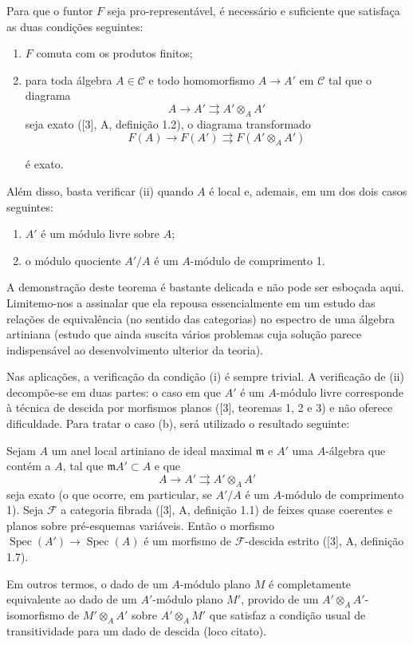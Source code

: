  Para que o funtor $F$ seja pro-representável, é necessário
e suficiente que satisfaça as duas condições seguintes:
\begin{enumerate}
\item[(i)] $F$ comuta com os produtos finitos;
\item[(ii)] para toda álgebra $A\in\mathcal C$ e todo homomorfismo
$A\longrightarrow A'$ em $\mathcal C$ tal que o diagrama
\[
  A\longrightarrow A'\rightrightarrows A'\otimes_A A'
\]
seja exato ([3], A, definição 1.2), o diagrama transformado
\[
  F(A)\longrightarrow F(A')\rightrightarrows F(A'\otimes_A A')
\]

é exato.
\end{enumerate}
Além disso, basta verificar (ii) quando $A$ é local e, ademais, em um dos
dois casos seguintes:
\begin{enumerate}
\item[(a)] $A'$ é um módulo livre sobre $A$;
\item[(b)] o módulo quociente $A'/A$ é um $A$-módulo de comprimento 1.
\end{enumerate}

A demonstração deste teorema é bastante delicada e não pode ser esboçada aqui.
Limitemo-nos a assinalar que ela repousa essencialmente em um estudo das relações
de equivalência (no sentido das categorias) no espectro de uma álgebra
artiniana (estudo que ainda suscita vários problemas cuja solução parece
indispensável ao desenvolvimento ulterior da teoria).

Nas aplicações, a verificação da condição (i) é sempre trivial.
A verificação de (ii) decompõe-se em duas partes: o caso em que $A'$ é um $A$-módulo livre
corresponde à técnica de descida por morfismos planos ([3], teoremas 1, 2 e
3) e não oferece dificuldade. Para tratar o caso (b), será utilizado o resultado
seguinte:

 Sejam $A$ um anel local artiniano de ideal maximal
$\mathfrak m$ e $A'$ uma $A$-álgebra que contém a $A$, tal que
$\mathfrak mA'\subset A$ e que
\[
  A\longrightarrow A'\rightrightarrows A'\otimes_A A'
\]
seja exato (o que ocorre, em particular, se $A'/A$ é um $A$-módulo de
comprimento 1). Seja $\mathcal F$ a categoria fibrada ([3], A, definição 1.1) de
feixes quase coerentes e planos sobre pré-esquemas variáveis. Então o
morfismo $\operatorname{Spec}(A')\longrightarrow\operatorname{Spec}(A)$ é um
morfismo de $\mathcal F$-descida estrito ([3], A, definição 1.7).

Em outros termos, o dado de um $A$-módulo plano $M$ é completamente
equivalente ao dado de um $A'$-módulo plano $M'$, provido de um
$A'\otimes_AA'$-isomorfismo de $M'\otimes_AA'$ sobre $A'\otimes_AM'$ que
satisfaz a condição usual de transitividade para um dado de descida (loco
citato).

